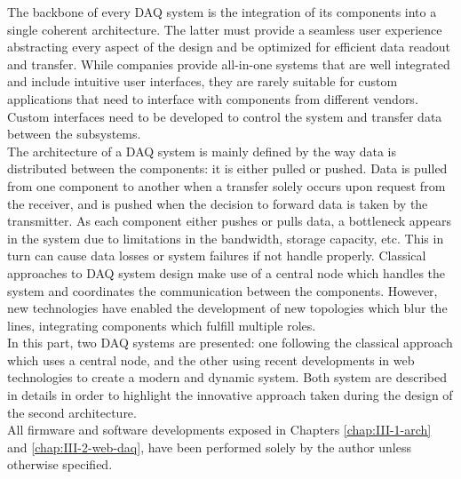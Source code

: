 The backbone of every DAQ system is the integration of its components into a single coherent architecture. The latter must provide a seamless user experience abstracting every aspect of the design and be optimized for efficient data readout and transfer. While companies provide all-in-one systems that are well integrated and include intuitive user interfaces, they are rarely suitable for custom applications that need to interface with components from different vendors. Custom interfaces need to be developed to control the system and transfer data between the subsystems. \\

The architecture of a DAQ system is mainly defined by the way data is distributed between the components: it is either pulled or pushed. Data is pulled from one component to another when a transfer solely occurs upon request from the receiver, and is pushed when the decision to forward data is taken by the transmitter. As each component either pushes or pulls data, a bottleneck appears in the system due to limitations in the bandwidth, storage capacity, etc. This in turn can cause data losses or system failures if not handle properly. Classical approaches to DAQ system design make use of a central node which handles the system and coordinates the communication between the components. However, new technologies have enabled the development of new topologies which blur the lines, integrating components which fulfill multiple roles. \\

In this part, two DAQ systems are presented: one following the classical approach which uses a central node, and the other using recent developments in web technologies to create a modern and dynamic system. Both system are described in details in order to highlight the innovative approach taken during the design of the second architecture. \\

All firmware and software developments exposed in Chapters \ref{chap:III-1-arch} and \ref{chap:III-2-web-daq}, have been performed solely by the author unless otherwise specified.
